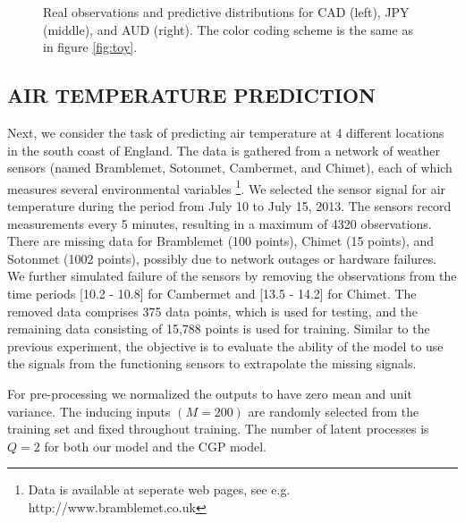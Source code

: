 \begin{figure}
\begin{tabular}{ccc}
\end{tabular}
\caption{Real observations and predictive distributions for CAD (left), JPY (middle), and AUD (right). The color coding scheme is the same as in figure \ref{fig:toy}.}
\label{fig:fx}
\end{figure}

\subsection{AIR TEMPERATURE PREDICTION}
Next, we consider the task of predicting air temperature at 4 different locations in the south coast of England. 
The data is gathered from a network of weather sensors (named Bramblemet, Sotonmet, Cambermet, and Chimet), each of which measures several environmental variables \citet{osborne2008towards}\footnote{Data is available at seperate web pages, see e.g. http://www.bramblemet.co.uk}.
We selected the sensor signal for air temperature during the period from July 10 to July 15, 2013.
The sensors record measurements every 5 minutes, resulting in a maximum of 4320 observations.
There are missing data for Bramblemet (100 points), Chimet (15 points), and Sotonmet (1002 points), possibly due to network outages or hardware failures.
We further simulated failure of the sensors by removing the observations from the time periods [10.2 - 10.8] for Cambermet and [13.5 - 14.2] for Chimet.
The removed data comprises 375 data points, which is used for testing, and the remaining data consisting of 15,788 points is used for training.
Similar to the previous experiment, the objective is to evaluate the ability of the model to use the signals from the functioning sensors to extrapolate the missing signals.

For pre-processing we normalized the outputs to have zero mean and unit variance.
The inducing inputs $(M = 200)$ are randomly selected from the training set and fixed throughout training.
The number of latent processes is $Q = 2$ for both our model and the CGP model.

